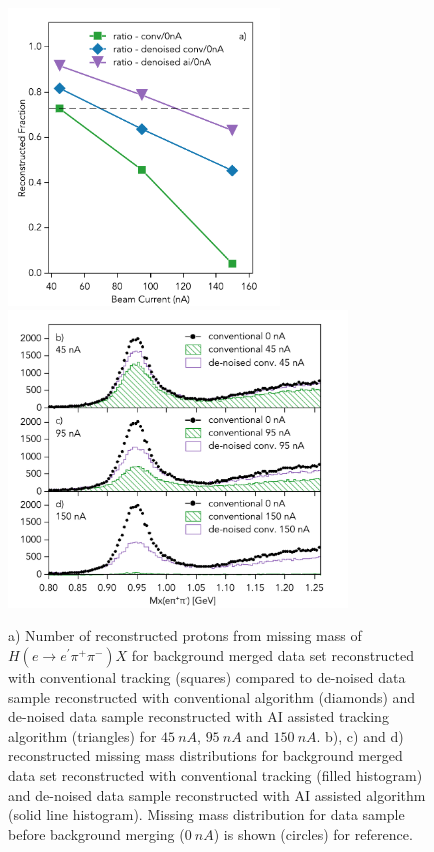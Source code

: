 \begin{figure}[!h]
\begin{center}
 \includegraphics[height=3.1in]{images/graph_mxepipi_dn_ai.pdf}
 \includegraphics[height=3.1in]{images/plots_mxepipi_dn_ai.pdf}
\caption { a) Number of reconstructed protons from missing mass of $H(e \rightarrow e^\prime \pi^+\pi^-)X$ 
for background merged data set reconstructed with conventional tracking (squares) compared to de-noised data sample 
reconstructed with conventional algorithm (diamonds) and de-noised data sample reconstructed with AI assisted tracking 
algorithm (triangles)  for $45~nA$, $95~nA$ and $150~nA$. b), c) and d) reconstructed missing mass distributions for 
background merged data set reconstructed with conventional tracking (filled histogram) and de-noised data sample 
reconstructed with AI assisted algorithm (solid line histogram). Missing mass distribution for data sample before 
background merging ($0~nA$) is shown (circles) for reference. }

 \label{physics::conv_dn_ai}
 \end{center}
\end{figure}

